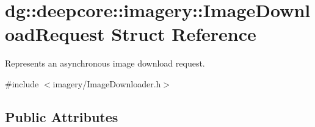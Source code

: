 \hypertarget{structdg_1_1deepcore_1_1imagery_1_1_image_download_request}{}\section{dg\+:\+:deepcore\+:\+:imagery\+:\+:Image\+Download\+Request Struct Reference}
\label{structdg_1_1deepcore_1_1imagery_1_1_image_download_request}


Represents an asynchronous image download request.  




{\ttfamily \#include $<$imagery/\+Image\+Downloader.\+h$>$}

\subsection*{Public Attributes}
